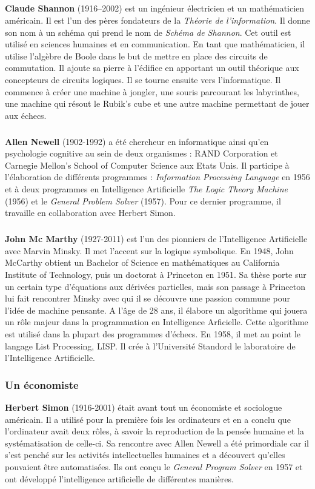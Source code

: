 \subparagraph{}
\textbf{Claude Shannon} (1916–2002) est un ingénieur électricien et un mathématicien américain. Il est l’un des pères fondateurs de la \textit{Théorie de l’information}. Il donne son nom à un schéma qui prend le nom de \textit{Schéma de Shannon}. Cet outil est utilisé en sciences humaines et en communication. En tant que  mathématicien, il utilise l’algèbre de Boole dans le but de mettre en place des circuits de commutation. Il ajoute sa pierre à l’édifice en apportant un outil théorique aux concepteurs de circuits logiques. Il se tourne ensuite vers l’informatique. Il commence à créer une machine à jongler, une souris parcourant les labyrinthes, une machine qui résout le Rubik's cube et une autre machine permettant de jouer aux échecs.


\subparagraph{}
\textbf{Allen Newell} (1902-1992) a été chercheur en informatique ainsi qu'en psychologie cognitive au sein de deux organismes : RAND Corporation et Carnegie Mellon’s School of Computer Science aux Etats Unis. Il participe à l'élaboration de différents programmes : \textit{Information Processing Language} en 1956 et à deux programmes en Intelligence Artificielle \textit{The Logic Theory Machine} (1956) et le \textit{General Problem Solver} (1957). Pour ce dernier programme, il travaille en collaboration avec Herbert Simon.


\subparagraph{}
\textbf{John Mc Marthy} (1927-2011) est l'un des pionniers de l'Intelligence Artificielle avec Marvin Minsky. Il met l'accent sur la logique symbolique. En 1948, John McCarthy obtient un Bachelor of Science en mathématiques au California Institute of Technology, puis un doctorat à Princeton en 1951. Sa thèse porte sur un certain type d'équations aux dérivées partielles, mais son passage à Princeton lui fait rencontrer Minsky avec qui il se découvre une passion commune pour l'idée de machine pensante. A l'âge de 28 ans, il élabore un algorithme qui jouera un rôle majeur dans la programmation en Intelligence Arficielle. Cette algorithme est utilisé dans la plupart des programmes d'échecs. En 1958, il met au point le langage List Processing, LISP. Il crée à l'Université Standord le laboratoire de l'Intelligence Artificielle. 




\subsubsection{Un économiste}

\textbf{Herbert Simon} (1916-2001) était avant tout un économiste et sociologue américain. Il a utilisé pour la première fois les ordinateurs et en a conclu que l'ordinateur avait deux rôles, à savoir la reproduction de la pensée humaine et la systématisation de celle-ci. Sa rencontre avec Allen Newell a été primordiale car il s'est penché sur les activités intellectuelles humaines et a découvert qu'elles pouvaient être automatisées. Ils ont conçu le \textit{General Program Solver} en 1957 et ont développé l'intelligence artificielle de différentes manières. 



